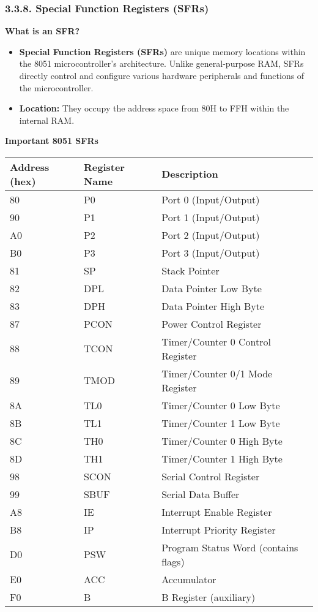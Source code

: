 \documentclass[
]{article}
\begin{document}
\hypertarget{338-special-function-registers-sfrs}{%
\subsubsection{3.3.8. Special Function Registers
(SFRs)}\label{338-special-function-registers-sfrs}}

\textbf{What is an SFR?}

\begin{itemize}
\item
  \textbf{Special Function Registers (SFRs)} are unique memory locations
  within the 8051 microcontroller's architecture. Unlike general-purpose
  RAM, SFRs directly control and configure various hardware peripherals
  and functions of the microcontroller.
\item
  \textbf{Location:} They occupy the address space from 80H to FFH
  within the internal RAM.
\end{itemize}

\textbf{Important 8051 SFRs}

\begin{longtable}[]{@{}lll@{}}
\toprule
Address (hex) & Register Name & Description \\
\midrule
\endhead
80 & P0 & Port 0 (Input/Output) \\
90 & P1 & Port 1 (Input/Output) \\
A0 & P2 & Port 2 (Input/Output) \\
B0 & P3 & Port 3 (Input/Output) \\
81 & SP & Stack Pointer \\
82 & DPL & Data Pointer Low Byte \\
83 & DPH & Data Pointer High Byte \\
87 & PCON & Power Control Register \\
88 & TCON & Timer/Counter 0 Control Register \\
89 & TMOD & Timer/Counter 0/1 Mode Register \\
8A & TL0 & Timer/Counter 0 Low Byte \\
8B & TL1 & Timer/Counter 1 Low Byte \\
8C & TH0 & Timer/Counter 0 High Byte \\
8D & TH1 & Timer/Counter 1 High Byte \\
98 & SCON & Serial Control Register \\
99 & SBUF & Serial Data Buffer \\
A8 & IE & Interrupt Enable Register \\
B8 & IP & Interrupt Priority Register \\
D0 & PSW & Program Status Word (contains flags) \\
E0 & ACC & Accumulator \\
F0 & B & B Register (auxiliary) \\
\bottomrule
\end{longtable}
\end{document}

